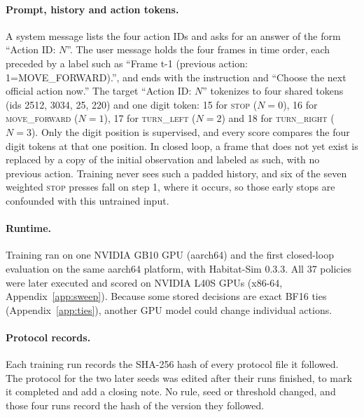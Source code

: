 \paragraph{Prompt, history and action tokens.}
A system message lists the four action IDs and asks for an answer of the form ``Action ID: $N$''.
The user message holds the four frames in time order, each preceded by a label such as
``Frame t-1 (previous action: 1=MOVE\_FORWARD).'', and ends with the instruction and ``Choose the
next official action now.'' The target ``Action ID: $N$'' tokenizes to four shared tokens (ids 2512,
3034, 25, 220) and one digit token: 15 for \textsc{stop} ($N=0$), 16 for \textsc{move\_forward}
($N=1$), 17 for \textsc{turn\_left} ($N=2$) and 18 for \textsc{turn\_right} ($N=3$). Only the digit
position is supervised, and every score compares the four digit tokens at that one position. In
closed loop, a frame that does not yet exist is replaced by a copy of the initial observation and
labeled as such, with no previous action. Training never sees such a padded history, and six of the
seven weighted \textsc{stop} presses fall on step 1, where it occurs, so those early stops are
confounded with this untrained input.

\paragraph{Runtime.}
Training ran on one NVIDIA GB10 GPU (aarch64) and the first closed-loop evaluation on the same
aarch64 platform, with Habitat-Sim 0.3.3. All 37 policies were later executed and scored on NVIDIA
L40S GPUs (x86-64, Appendix~\ref{app:sweep}). Because some stored decisions are exact BF16 ties (Appendix~\ref{app:ties}), another GPU model could
change individual actions.

\paragraph{Protocol records.}
Each training run records the SHA-256 hash of every protocol file it followed. The protocol for the
two later seeds was edited after their runs finished, to mark it completed and add a closing note.
No rule, seed or threshold changed, and those four runs record the hash of the version they followed.
